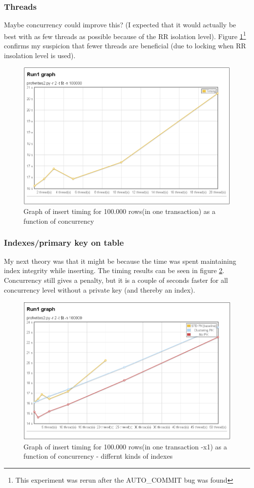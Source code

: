 \subsubsection{Threads}
Maybe concurrency could improve this?
(I expected that it would actually be best with as few threads as possible
because of the RR isolation level). Figure \ref{fig:part1athreads}\footnote{This
experiment was rerun after the AUTO\_COMMIT bug was found} confirms my
suspicion that fewer threads are beneficial (due to locking when RR insolation
level is used).
\begin{figure}
  \centering
  \includegraphics[width=12cm]{assignment2/run1}
  \caption[Insert performance]{Graph of insert timing for 100.000 rows(in one
  transaction) as a function of concurrency}\label{fig:part1athreads}
\end{figure}

\subsubsection{Indexes/primary key on table}
My next theory was that it might be because the time was spent maintaining index
integrity while inserting. The timing results can be seen in figure
\ref{fig:part1aindex1}. Concurrency still gives a penalty, but it is a couple of
seconds faster for all concurrency level without a private key (and thereby an
index).
\begin{figure}
  \centering
  \includegraphics[width=12cm]{assignment2/run1index}
  \caption[Insert performance]{Graph of insert timing for 100.000 rows(in one
  transaction -x1) as a function of concurrency - differnt kinds of indexes}\label{fig:part1aindex1}
\end{figure}

